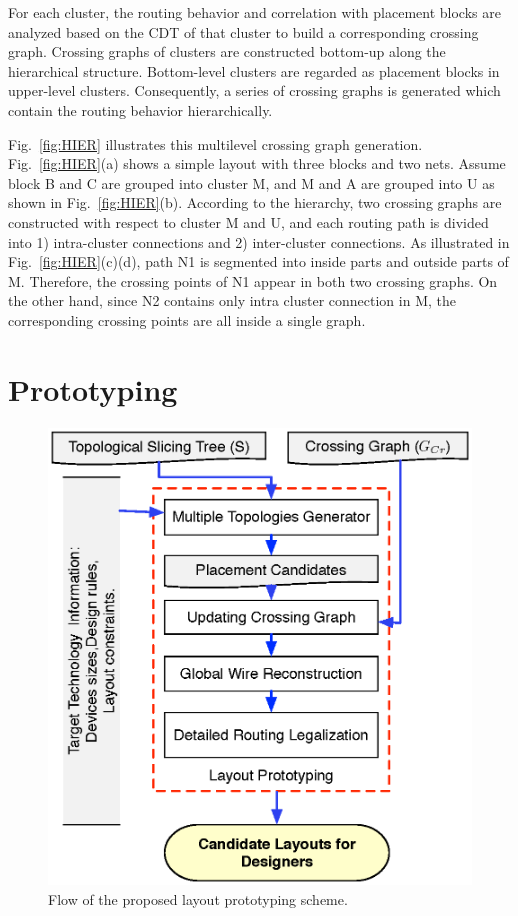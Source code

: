       For each cluster, the routing behavior and correlation with placement blocks are analyzed based on the CDT of that cluster to build a corresponding crossing graph. 
      Crossing graphs of clusters are constructed bottom-up along the hierarchical structure. 
      Bottom-level clusters are regarded as placement blocks in upper-level clusters. 
      Consequently, a series of crossing graphs is generated which contain the routing behavior hierarchically.

      Fig.~\ref{fig:HIER} illustrates this multilevel crossing graph generation.
      Fig.~\ref{fig:HIER}(a) shows a simple layout with three blocks and two nets.
      Assume block B and C are grouped into cluster M, and M and A are grouped into U as shown in Fig.~\ref{fig:HIER}(b).
      According to the hierarchy, two crossing graphs are constructed with respect to cluster M and U, and
      each routing path is divided into 1) intra-cluster connections and 2) inter-cluster connections. 
      As illustrated in Fig.~\ref{fig:HIER}(c)(d), path N1 is segmented into inside parts and outside parts of M. 
      Therefore, the crossing points of N1 appear in both two crossing graphs. 
      On the other hand, since N2 contains only intra cluster connection in M, the corresponding crossing points are all inside a single graph.

  \section{Prototyping}\label{sec:Proto}

    \begin{figure}[t]
      \centering
      \includegraphics[height=0.7\textwidth]{Fig/Chapter4/Proto_Flow.eps}
      \caption{Flow of the proposed layout prototyping scheme.} 
      \label{fig:Proto_Flow}
    \end{figure}

